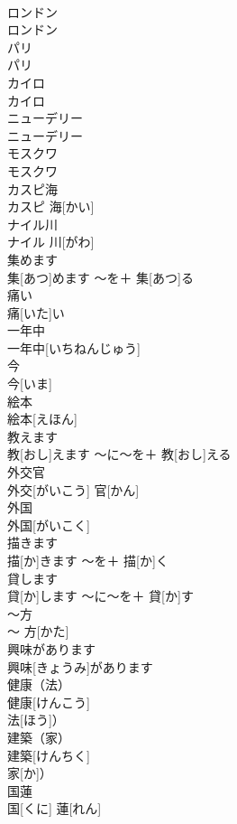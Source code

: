 \documentclass[8pt]{extreport}
\begin{document}
\begin{CJK}{UTF8}{min}
\\	ロンドン	
\\	ロンドン		
\\	パリ	
\\	パリ		
\\	カイロ	
\\	カイロ		
\\	ニューデリー	
\\	ニューデリー		
\\	モスクワ	
\\	モスクワ		
\\	カスピ海	
\\	カスピ 海[かい]		
\\	ナイル川	
\\	ナイル 川[がわ]		
\\	集めます	
\\	集[あつ]めます	〜を＋ 集[あつ]る	
\\	痛い	
\\	痛[いた]い		
\\	一年中	
\\	一年中[いちねんじゅう]		
\\	今	
\\	今[いま]		
\\	絵本	
\\	絵本[えほん]		
\\	教えます	
\\	教[おし]えます	〜に〜を＋ 教[おし]える	
\\	外交官	
\\	外交[がいこう] 官[かん]		
\\	外国	
\\	外国[がいこく]		
\\	描きます	
\\	描[か]きます	〜を＋ 描[か]く	
\\	貸します	
\\	貸[か]します	〜に〜を＋ 貸[か]す	
\\	〜方	
\\	〜 方[かた]		
\\	興味があります	
\\	興味[きょうみ]があります		
\\	健康（法）	
\\	健康[けんこう]
\\	法[ほう]）		
\\	建築（家）	
\\	建築[けんちく]
\\	家[か]）		
\\	国蓮	
\\	国[くに] 蓮[れん]		

\end{CJK}
\end{document}
